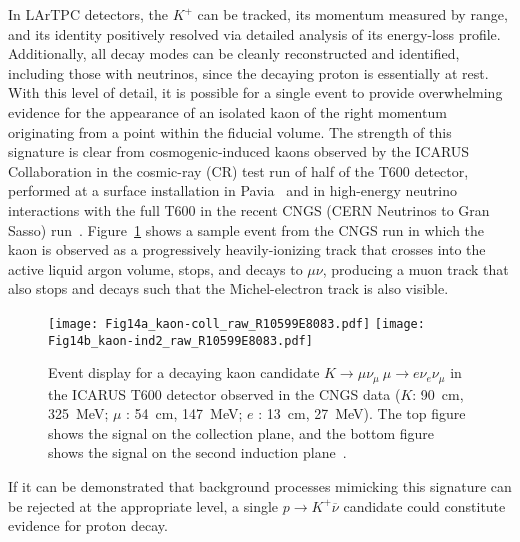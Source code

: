 In LArTPC detectors, the $K^+$ can be tracked, its momentum measured
by range, and its identity positively resolved via detailed analysis
of its energy-loss profile.  Additionally, all decay modes can be
cleanly reconstructed and identified, including those with neutrinos,
since the decaying proton is essentially at rest.  With this level of
detail, it is possible for a single event to provide overwhelming
evidence for the appearance of an isolated kaon of the right momentum
originating from a point within the fiducial volume.  The strength of
this signature is clear from cosmogenic-induced kaons observed by the
ICARUS Collaboration in the cosmic-ray (CR) test run of half of the T600
detector, performed at a surface installation in Pavia~\cite{Amerio:2004ze} 
and in high-energy neutrino interactions with the full T600 in the recent 
CNGS (CERN Neutrinos to Gran Sasso) run~\cite{Antonello:2012hu}.
Figure~\ref{fig:icaruskaon} shows a sample event from the CNGS run in
which the kaon is observed as a progressively heavily-ionizing track 
that crosses into the active liquid argon volume, stops, and
decays to $\mu\nu$, producing a muon track that also stops and decays
such that the Michel-electron track is also visible. 
%
\begin{figure}[!htb]
\centering
\texttt{[image: Fig14a\_kaon-coll\_raw\_R10599E8083.pdf]}
\texttt{[image: Fig14b\_kaon-ind2\_raw\_R10599E8083.pdf]}
\caption[Decaying kaon observed during the ICARUS run at CNGS]
{Event display for a decaying kaon candidate $K \rightarrow \mu \nu_\mu \ \mu \rightarrow e \nu_e \nu_\mu$ 
in the ICARUS T600 detector observed
in the CNGS data ($K$: \SI{90}{\cm}, \SI{325}{\MeV}; $\mu$ : \SI{54}{\cm}, \SI{147}{\MeV}; 
$e$ : \SI{13}{\cm}, \SI{27}{\MeV}). The top figure shows the signal on the collection plane,
  and the bottom figure shows the signal on the second induction plane~\cite{Antonello:2012hu}.}
\label{fig:icaruskaon}
\end{figure}

If it can be demonstrated that background processes mimicking this
signature can be rejected at the appropriate level, 
a single $p\to K^+\overline{\nu}$ candidate could constitute 
evidence for proton decay. %

